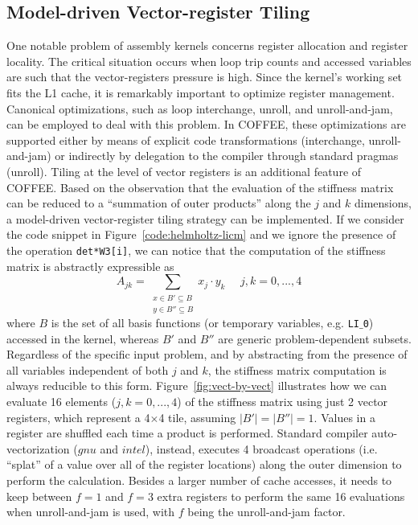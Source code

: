 \documentclass[conference]{IEEEtran}
\begin{document}
\subsection{Model-driven Vector-register Tiling}
One notable problem of assembly kernels concerns register allocation and register locality. The critical situation occurs when loop trip counts and accessed variables are such that the vector-registers pressure is high. Since the kernel's working set fits the L1 cache, it is remarkably important to optimize register management. Canonical optimizations, such as loop interchange, unroll, and unroll-and-jam, can be employed to deal with this problem. In COFFEE, these optimizations are supported either by means of explicit code transformations (interchange, unroll-and-jam) or indirectly by delegation to the compiler through standard pragmas (unroll). Tiling at the level of vector registers is an additional feature of COFFEE. Based on the observation that the evaluation of the stiffness matrix can be reduced to a ``summation of outer products'' along the $j$ and $k$ dimensions, a model-driven vector-register tiling strategy can be implemented. If we consider the code snippet in Figure~\ref{code:helmholtz-licm} and we ignore the presence of the operation \texttt{det*W3[i]}, we can notice that the computation of the stiffness matrix is abstractly expressible as
\begin{equation}
\label{outer-product}
A_{jk} = \sum_{\substack{
  x \in B' \subseteq B \\
  y \in B'' \subseteq B}}
x_j\cdot y_k ~~~~~~ j,k = 0,...,4
\end{equation}
where $B$ is the set of all basis functions (or temporary variables, e.g. \texttt{LI$\_$0}) accessed in the kernel, whereas $B'$ and $B''$ are generic problem-dependent subsets. Regardless of the specific input problem, and by abstracting from the presence of all variables independent of both $j$ and $k$, the stiffness matrix computation is always reducible to this form. Figure~\ref{fig:vect-by-vect} illustrates how we can evaluate 16 elements ($j,k=0,...,4$) of the stiffness matrix using just 2 vector registers, which represent a 4$\times$4 tile, assuming $\vert B' \vert = \vert B'' \vert = 1$. Values in a register are shuffled each time a product is performed. Standard compiler auto-vectorization ($gnu$ and $intel$), instead, executes 4 broadcast operations (i.e. ``splat'' of a value over all of the register locations) along the outer dimension to perform the calculation. Besides a larger number of cache accesses, it needs to keep between $f=1$ and $f=3$ extra registers to perform the same 16 evaluations when unroll-and-jam is used, with $f$ being the unroll-and-jam factor.
\end{document}
